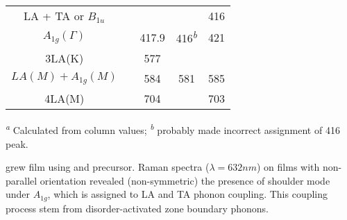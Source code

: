 \begin{table}
\begin{tabular}{ccccc}
     LA + TA \cite{Sourisseau1991} or $B_{1u}$\cite{Staiger2012}  &      &       &   &  416 \\
          $A_{1g}(\Gamma)$   &      & 417.9                        & 416\textsuperscript{\emph{b}} &  421\\
               3LA(K)        &      & 577                          &              &      \\
       $ LA(M)+ A_{1g}(M)$   &      & 584                          & 581          &  585 \\
    4LA(M)                   &      & 704                          &              &  703\\
    \bottomrule
  \end{tabular}

  \textsuperscript{\emph{a}} Calculated from column values;
  \textsuperscript{\emph{b}} \citeauthor{JMR7990865} probably made incorrect assignment of 416 peak.\cite{JMR7990865}
\end{table}

\citeauthor{Chung1998} grew  film using  and  precursor.\cite{Chung1998} Raman spectra ($\lambda=632nm$) on films with non-parallel orientation revealed (non-symmetric) the presence of shoulder mode under $A_{1g}$, which is assigned to LA and TA phonon coupling. This coupling process stem from disorder-activated zone boundary phonons.

